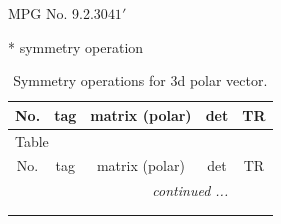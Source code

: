 \documentclass[fleqn,8pt]{jsarticle}
\begin{document}
\setcounter{MaxMatrixCols}{32}

\renewcommand{\tablename}{Table~}
\renewcommand{\figurename}{Figure~}
\begin{center}
\LARGE
MPG No. 9.2.30\quad$41'$
\end{center}
* symmetry operation
\renewcommand{\arraystretch}{1.3}
\begin{longtable}{ccccc}
\caption{Symmetry operations for 3d polar vector.}
 \\
 \hline \hline
No. & tag & matrix (polar) & det & TR \\ \hline \endfirsthead

\multicolumn{4}{l}{\tablename\ \thetable{}} \\
 \hline \hline
No. & tag & matrix (polar) & det & TR \\ \hline \endhead

 \hline \hline
\multicolumn{4}{r}{\footnotesize\it continued ...} \\ \endfoot

 \hline \hline
\multicolumn{4}{r}{} \\ \endlastfoot


\end{longtable}
\end{document}
